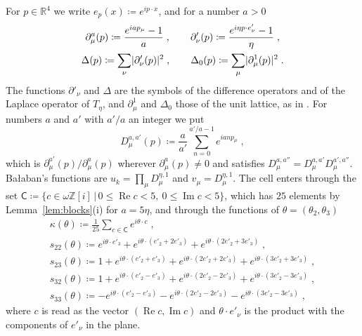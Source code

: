 \documentclass[11pt]{preprint}
\DeclarePairedDelimiter{\abs}{\lvert}{\rvert}
\numberwithin{equation}{section}
\theoremstyle{definition}
\theoremstyle{remark}
\theoremstyle{plain}
\begin{document}
For $p \in \mathbb R^4$ we write $e_p(x) \coloneqq e^{ip \cdot x}$, and for a number $a > 0$
\begin{equation}\label{eq:symbols-basic}
\begin{gathered}
    \partial^a_\mu(p) \coloneqq \frac{e^{iap_\mu} - 1}{a}\;,
    \qquad
    \partial'_\nu(p) \coloneqq \frac{e^{i\eta p \cdot e'_\nu} - 1}{\eta}\;,\\
    \Delta(p) \coloneqq \sum_\nu\abs{\partial'_\nu(p)}^2\;,
    \qquad
    \Delta_0(p) \coloneqq \sum_\mu\abs{\partial^1_\mu(p)}^2\;.
\end{gathered}
\end{equation}
The functions $\partial'_\nu$ and $\Delta$ are the symbols of the difference operators and of the Laplace operator of $T_\eta$, and $\partial^1_\mu$ and $\Delta_0$ those of the unit lattice, as in \cite[(1.31), p.~23, and p.~24]{BalabanPRT1}. For numbers $a$ and $a'$ with $a'/a$ an integer we put
\begin{equation}\label{eq:dirichlet}
    D^{a,a'}_\mu(p) \coloneqq \frac{a}{a'}\sum_{n=0}^{a'/a-1}e^{ianp_\mu}\;,
\end{equation}
which is $\partial^{a'}_\mu(p)/\partial^a_\mu(p)$ wherever $\partial^a_\mu(p) \neq 0$ and satisfies $D^{a,a''}_\mu = D^{a,a'}_\mu D^{a',a''}_\mu$. Ba{\l}aban's functions are $u_k = \prod_\mu D^{\eta,1}_\mu$ and $v_\mu = D^{\eta,1}_\mu$. The cell enters through the set $\mathsf C \coloneqq \{ c \in \omega\mathbb Z[i] \, | \, 0 \leq \operatorname{Re}c < 5,\ 0 \leq \operatorname{Im}c < 5 \}$, which has $25$ elements by Lemma~\ref{lem:blocks}(i) for $a = 5\eta$, and through the functions of $\theta = (\theta_2, \theta_3)$
\begin{equation}\label{eq:cell-symbols}
\begin{gathered}
    \kappa(\theta) \coloneqq \frac{1}{25}\sum_{c \in \mathsf C}e^{i\theta \cdot c}\;,\\
    s_{22}(\theta) \coloneqq e^{i\theta \cdot e'_3} + e^{i\theta \cdot (e'_2 + 2e'_3)} + e^{i\theta \cdot (2e'_2 + 3e'_3)}\;,\\
    s_{23}(\theta) \coloneqq 1 + e^{i\theta \cdot (e'_2 + e'_3)} + e^{i\theta \cdot (2e'_2 + 2e'_3)} + e^{i\theta \cdot (3e'_2 + 3e'_3)}\;,\\
    s_{32}(\theta) \coloneqq 1 + e^{i\theta \cdot (e'_2 - e'_3)} + e^{i\theta \cdot (2e'_2 - 2e'_3)} + e^{i\theta \cdot (3e'_2 - 3e'_3)}\;,\\
    s_{33}(\theta) \coloneqq -e^{i\theta \cdot (e'_2 - e'_3)} - e^{i\theta \cdot (2e'_2 - 2e'_3)} - e^{i\theta \cdot (3e'_2 - 3e'_3)}\;,
\end{gathered}
\end{equation}
where $c$ is read as the vector $(\operatorname{Re}c, \operatorname{Im}c)$ and $\theta \cdot e'_\nu$ is the product with the components of $e'_\nu$ in the plane.
\end{document}
